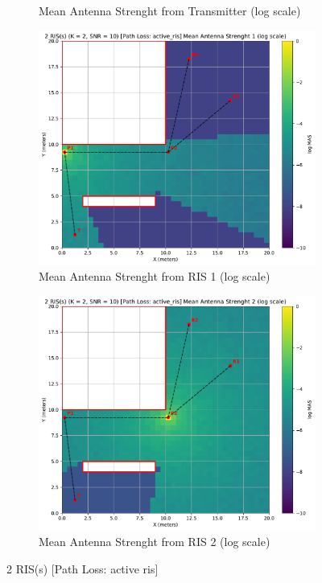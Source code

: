 \begin{figure}[H]
\begin{subfigure}[b]{0.48\textwidth}
    \caption{Mean Antenna Strenght from Transmitter (log scale)}
  \end{subfigure}
  \medskip
  \centering
  \begin{subfigure}[b]{0.48\textwidth}
    \centering
    \includegraphics[width=\textwidth]{imgs/heatmap-simulations/2 RIS(s) (K = 2, SNR = 10) [Path Loss: active_ris] Mean Antenna Strenght 1 (log scale).pdf}
    \caption{Mean Antenna Strenght from RIS 1 (log scale)}
  \end{subfigure}
  \hfill
  \begin{subfigure}[b]{0.48\textwidth}
    \centering
    \includegraphics[width=\textwidth]{imgs/heatmap-simulations/2 RIS(s) (K = 2, SNR = 10) [Path Loss: active_ris] Mean Antenna Strenght 2 (log scale).pdf}
    \caption{Mean Antenna Strenght from RIS 2 (log scale)}
  \end{subfigure}
  \caption{2 RIS(s) [Path Loss: active ris]}
\end{figure}


